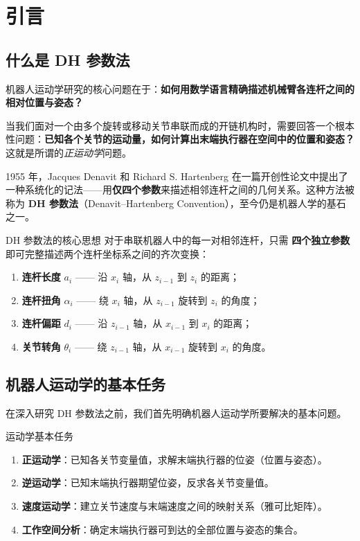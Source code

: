\chapter{引言}

\section{什么是 DH 参数法}

机器人运动学研究的核心问题在于：\textbf{如何用数学语言精确描述机械臂各连杆之间的相对位置与姿态？}

当我们面对一个由多个旋转或移动关节串联而成的开链机构时，需要回答一个根本性问题：\textbf{已知各个关节的运动量，如何计算出末端执行器在空间中的位置和姿态？}这就是所谓的\emph{正运动学}问题。

1955 年，Jacques Denavit 和 Richard S. Hartenberg 在一篇开创性论文中提出了一种系统化的记法——用\textbf{仅四个参数}来描述相邻连杆之间的几何关系。这种方法被称为 \textbf{DH 参数法}（Denavit–Hartenberg Convention），至今仍是机器人学的基石之一。

\begin{myTheorem}{DH 参数法的核心思想}
	对于串联机器人中的每一对相邻连杆，只需 \textbf{四个独立参数} 即可完整描述两个连杆坐标系之间的齐次变换：
	\begin{enumerate}
		\item \textbf{连杆长度} $a_i$ —— 沿 $x_i$ 轴，从 $z_{i-1}$ 到 $z_i$ 的距离；
		\item \textbf{连杆扭角} $\alpha_i$ —— 绕 $x_i$ 轴，从 $z_{i-1}$ 旋转到 $z_i$ 的角度；
		\item \textbf{连杆偏距} $d_i$ —— 沿 $z_{i-1}$ 轴，从 $x_{i-1}$ 到 $x_i$ 的距离；
		\item \textbf{关节转角} $\theta_i$ —— 绕 $z_{i-1}$ 轴，从 $x_{i-1}$ 旋转到 $x_i$ 的角度。
	\end{enumerate}
\end{myTheorem}

\section{机器人运动学的基本任务}

在深入研究 DH 参数法之前，我们首先明确机器人运动学所要解决的基本问题。

\begin{myTheorem}{运动学基本任务}
	\begin{enumerate}
		\item \textbf{正运动学}：已知各关节变量值，求解末端执行器的位姿（位置与姿态）。
		\item \textbf{逆运动学}：已知末端执行器期望位姿，反求各关节变量值。
		\item \textbf{速度运动学}：建立关节速度与末端速度之间的映射关系（雅可比矩阵）。
		\item \textbf{工作空间分析}：确定末端执行器可到达的全部位置与姿态的集合。
	\end{enumerate}
\end{myTheorem}

